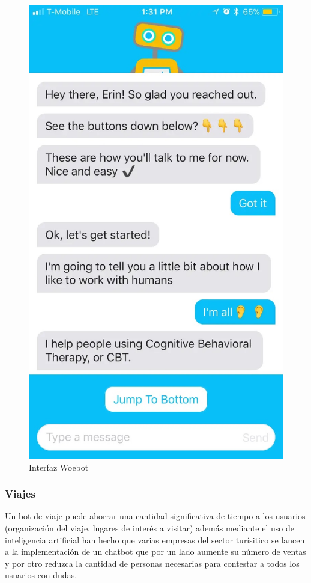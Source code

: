 \begin{figure}[H]
    \centering
    \includegraphics[scale=0.15]{include/figuras/woebot.jpg}
    \caption{Interfaz Woebot}
    \label{fig:woebot}
\end{figure}


\subsubsection{Viajes}
Un bot de viaje puede ahorrar una cantidad significativa de tiempo a los usuarios (organización del viaje, lugares de interés a visitar) además mediante el uso de inteligencia artificial han hecho que varias empresas del sector turísitico se lancen a la implementación de un chatbot que por un lado aumente su número de ventas y por otro reduzca la cantidad de personas necesarias para contestar a todos los usuarios con dudas.

